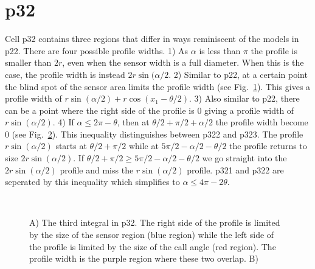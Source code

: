 \section{p32} \label{p32}

Cell p32 contains three regions that differ in ways reminiscent of the models in p22. There are four possible profile widths. 1) As $\alpha$ is less than $\pi$ the profile is smaller than $2r$, even when the sensor width is a full diameter. When this is the case, the profile width is instead $2r\sin(\alpha/2$. 2) Similar to p22, at a certain point the blind spot of the sensor area limits the profile width (see Fig.~\ref{f:p32AT}). This gives a profile width of $r\sin(\alpha/2) + r\cos(x_1 - \theta/2)$. 3) Also similar to p22, there can be a point where the right side of the profile is 0 giving a profile width of $r\sin(\alpha/2)$. 4) If $\alpha \le 2\pi - \theta$, then at $\theta/2 + \pi/2 + \alpha/2 $ the profile width become 0 (see Fig.~\ref{f:p32Last}). This inequality distinguishes between p322 and p323. The profile $r\sin(\alpha/2)$ starts at $\theta/2 + \pi/2$ while at $5\pi/2 - \alpha/2 - \theta/2$ the profile returns to size $2r\sin(\alpha/2)$. If $\theta/2 + \pi/2 \ge 5\pi/2 - \alpha/2 - \theta/2$ we go straight into the  $2r\sin(\alpha/2)$ profile and miss the $r\sin(\alpha/2)$ profile.  p321 and p322 are seperated by this inequality which simplifies to $\alpha \le 4\pi - 2\theta$. 



\begin{figure}[t]
        \centering
        \begin{subfigure}[t]{0.3\textwidth}
                \centering
                \caption{}
                \label{f:p32AT}
        \end{subfigure}
~ 
        \begin{subfigure}[t]{0.3\textwidth}
                \centering
                \caption{}
                \label{f:p32Last}
        \end{subfigure}
\caption{A) The third integral in p32. The right side of the profile is limited by the size of the sensor region (blue region) while the left side of the profile is limited by the size of the call angle (red region). The profile width is the purple region where these two overlap. B)     }
\label{f:p32}
\end{figure}

